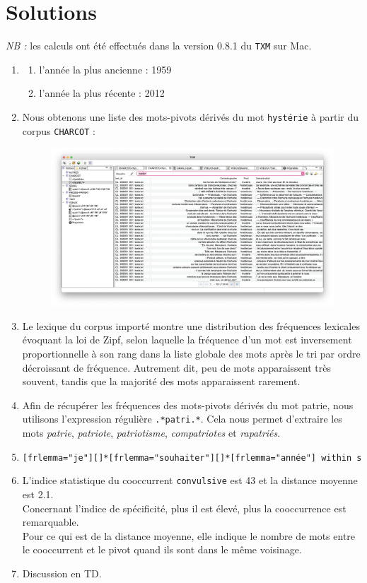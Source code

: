 \documentclass[xcolor={table,usenames,dvipsnames}]{article}
\begin{document}
\section{Solutions}
\textit{NB :} les calculs ont été effectués dans la version \textsc{0.8.1} du \texttt{TXM} sur Mac.
\begin{enumerate}
	\item
	\begin{enumerate}
		\item l'année la plus ancienne : 1959 
		\item l'année la plus récente : 2012
 	\end{enumerate}
 	
 	\item Nous obtenons une liste des mots-pivots dérivés du mot \texttt{hystérie} à partir du corpus \texttt{CHARCOT} :
 	\begin{figure}[h] %
 		\centering
 		\includegraphics[width=0.80\linewidth]{img/hysterie.png}
 		\label{fig:ling_out_TAL}
 	\end{figure}
 	
 	\item Le lexique du corpus importé montre une distribution des fréquences lexicales évoquant la loi de Zipf, selon laquelle la fréquence d'un mot est inversement proportionnelle à son rang dans la liste globale des mots après le tri par ordre décroissant de fréquence. Autrement dit, peu de mots apparaissent très souvent, tandis que la majorité des mots apparaissent rarement.
 	
 	\item Afin de récupérer les fréquences des mots-pivots dérivés du mot \og{}patrie\fg{}, nous utilisons l'expression régulière \texttt{.*patri.*}. Cela nous permet d'extraire les mots \textit{patrie}, \textit{patriote}, \textit{patriotisme}, \textit{compatriotes} et \textit{rapatriés}.
 	
 	\item \texttt{[frlemma="je"][]*[frlemma="souhaiter"][]*[frlemma="année"] within s}
 	\item L'indice statistique du cooccurrent \texttt{convulsive} est \textsc{43} et la distance moyenne est \textsc{2.1}.\\ Concernant l'indice de spécificité, plus il est élevé, plus
 	la cooccurrence est remarquable. \\
 	Pour ce qui est de la distance moyenne, elle indique le nombre de mots entre le cooccurrent et le pivot quand ils sont dans le même voisinage.
 	\item Discussion en \textsc{TD}.
 	
\end{enumerate}



		\printbibliography

	
\end{document}
